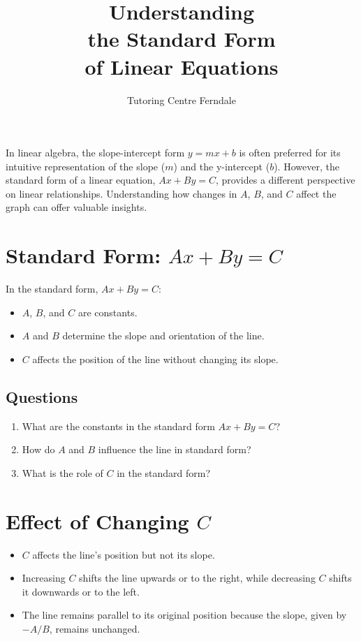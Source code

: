\documentclass[12pt]{article}
\begin{document}
\title{Understanding\\the Standard Form\\of Linear Equations}
\author{Tutoring Centre Ferndale}
\date{}
\maketitle

In linear algebra, the slope-intercept form \(y = mx + b\) is often preferred for its intuitive representation of the slope (\(m\)) and the y-intercept (\(b\)). However, the standard form of a linear equation, \(Ax + By = C\), provides a different perspective on linear relationships. Understanding how changes in \(A\), \(B\), and \(C\) affect the graph can offer valuable insights.

\section*{Standard Form: \(Ax + By = C\)}

In the standard form, \(Ax + By = C\):
\begin{itemize}
    \item \(A\), \(B\), and \(C\) are constants.
    \item \(A\) and \(B\) determine the slope and orientation of the line.
    \item \(C\) affects the position of the line without changing its slope.
\end{itemize}

\subsection*{Questions}
\begin{enumerate}
    \item What are the constants in the standard form \(Ax + By = C\)?
    \item How do \(A\) and \(B\) influence the line in standard form?
    \item What is the role of \(C\) in the standard form?
\end{enumerate}

\newpage

\section*{Effect of Changing \(C\)}

\begin{itemize}
    \item \(C\) affects the line's position but not its slope.
    \item Increasing \(C\) shifts the line upwards or to the right, while decreasing \(C\) shifts it downwards or to the left.
    \item The line remains parallel to its original position because the slope, given by \(-A/B\), remains unchanged.
\end{itemize}
\end{document}
